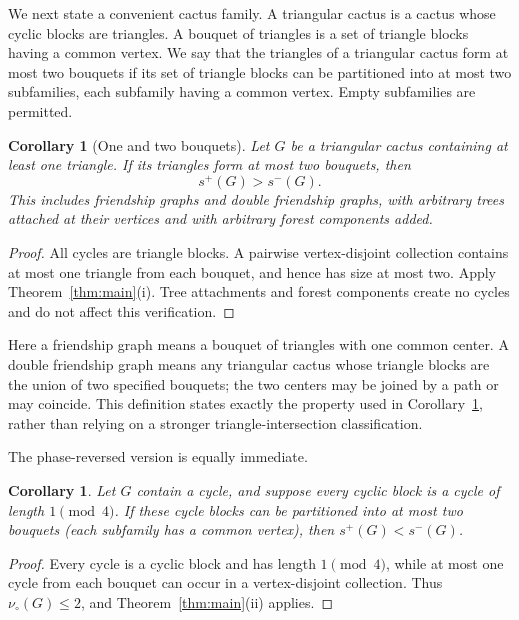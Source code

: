 \documentclass[11pt]{article}
\newtheorem{corollary}[theorem]{Corollary}
\theoremstyle{definition}
\theoremstyle{remark}
\newcommand{\vp}{\nu_{\circ}}
\begin{document}
We next state a convenient cactus family.  A triangular cactus is a
cactus whose cyclic blocks are triangles.  A bouquet of triangles is a
set of triangle blocks having a common vertex.  We say that the triangles
of a triangular cactus form at most two bouquets if its set of triangle
blocks can be partitioned into at most two subfamilies, each subfamily
having a common vertex.  Empty subfamilies are permitted.

\begin{corollary}[One and two bouquets]\label{cor:bouquet}
Let $G$ be a triangular cactus containing at least one triangle.  If its
triangles form at most two bouquets, then
\[
 s^+(G)>s^-(G).
\]
This includes friendship graphs and double friendship graphs, with
arbitrary trees attached at their vertices and with arbitrary forest
components added.
\end{corollary}

\begin{proof}
All cycles are triangle blocks.  A pairwise vertex-disjoint collection
contains at most one triangle from each bouquet, and hence has size at
most two.  Apply Theorem~\ref{thm:main}(i).  Tree attachments and forest
components create no cycles and do not affect this verification.
\end{proof}

Here a friendship graph means a bouquet of triangles with one common
center.  A double friendship graph means any triangular cactus whose
triangle blocks are the union of two specified bouquets; the two centers
may be joined by a path or may coincide.  This definition states exactly
the property used in Corollary~\ref{cor:bouquet}, rather than relying on a
stronger triangle-intersection classification.

The phase-reversed version is equally immediate.

\begin{corollary}\label{cor:one-mod-four-cactus}
Let $G$ contain a cycle, and suppose every cyclic block is a cycle of
length $1\pmod4$.  If these cycle blocks can be partitioned into at most
two bouquets (each subfamily has a common vertex), then
$s^+(G)<s^-(G)$.
\end{corollary}

\begin{proof}
Every cycle is a cyclic block and has length $1\pmod4$, while at most one
cycle from each bouquet can occur in a vertex-disjoint collection.  Thus
$\vp(G)\le2$, and Theorem~\ref{thm:main}(ii) applies.
\end{proof}
\end{document}
